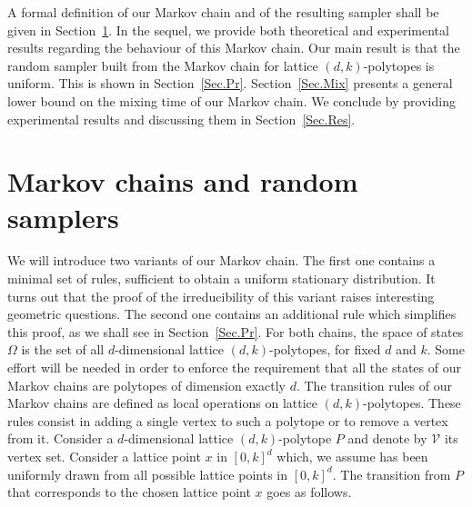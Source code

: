 \documentclass[a4paper,10pt]{article}
\begin{document}
A formal definition of our Markov chain and of the resulting sampler shall be given in Section~\ref{Sec.MC}. In the sequel, we provide both theoretical and experimental results regarding the behaviour of this Markov chain. Our main result is that the random sampler built from the Markov chain for lattice $(d,k)$-polytopes is uniform. This is shown in Section~\ref{Sec.Pr}. Section~\ref{Sec.Mix} presents a general lower bound on the mixing time of our Markov chain. We conclude by providing experimental results and discussing them in Section~\ref{Sec.Res}.

\section{Markov chains and random samplers}\label{Sec.MC}

We will introduce two variants of our Markov chain. The first one contains a minimal set of rules, sufficient to obtain a uniform stationary distribution. It turns out that the proof of the irreducibility of this variant raises interesting geometric questions. The second one contains an additional rule which simplifies this proof, as we shall see in Section~\ref{Sec.Pr}. For both chains, the space of states $\Omega$ is the set of all $d$-dimensional lattice $(d,k)$-polytopes, for fixed $d$ and $k$. Some effort will be needed in order to enforce the requirement that all the states of our Markov chains are polytopes of dimension exactly $d$. The transition rules of our Markov chains are defined as local operations on lattice $(d,k)$-polytopes. These rules consist in adding a single vertex to such a polytope or to remove a vertex from it. Consider a $d$-dimensional lattice $(d,k)$-polytope $P$ and denote by $\mathcal{V}$ its vertex set. Consider a lattice point $x$ in $[0,k]^d$ which, we assume has been uniformly drawn from all possible lattice points in $[0,k]^d$. The transition from $P$ that corresponds to the chosen lattice point $x$ goes as follows.
\end{document}
